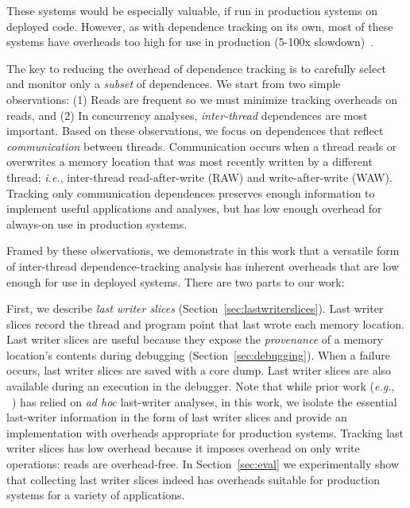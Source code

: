 \documentclass[preprint,9pt]{sigplanconf}
\begin{document}

These systems would be especially valuable, if run in production systems on
deployed code.  However, as with dependence tracking on its own, most of these
systems have overheads too high for use in production (5-100x
slowdown)~\cite{raceslicing,dmtracker,velodrome,recon,defuse,oshajava,chimera,coredet,stm}.


The key to reducing the overhead of dependence tracking is to carefully select
and monitor only a {\em subset} of dependences.  We start from two simple
observations: (1) Reads are frequent so we must minimize tracking overheads on
reads, and (2) In concurrency analyses, {\em inter-thread} dependences are most
important.  Based on these observations, we focus on dependences that reflect
{\em communication} between threads.  Communication occurs when a thread reads
or overwrites a memory location that was most recently written by a different
thread; {\em i.e.}, inter-thread read-after-write (RAW) and write-after-write
(WAW).  Tracking only communication dependences preserves enough information to
implement useful applications and analyses, but has low enough overhead for
always-on use in production systems.

Framed by these observations, we demonstrate in this work that a 
versatile form of inter-thread dependence-tracking analysis has inherent
overheads that are low enough for use in deployed systems.  There are two parts
to our work:

First, we describe {\em last writer slices}
(Section~\ref{sec:lastwriterslices}).  Last writer slices record the thread and
program point that last wrote each memory location.     Last writer slices are
useful because they expose the {\em provenance} of a memory location's contents
during debugging (Section~\ref{sec:debugging}).  When a failure occurs, last
writer slices are saved with a core dump.  Last writer slices are also
available during an execution in the debugger.  Note that while prior work
({\em e.g.}, ~\cite{recon,fasttrack,conmem,conseq,cci}) has relied on {\em ad
hoc} last-writer analyses, in this work, we isolate the essential last-writer
information in the form of last writer slices and provide an implementation
with overheads appropriate for production systems.  Tracking last writer slices
has low overhead because it imposes overhead on only write operations:  reads
are overhead-free.  In Section~\ref{sec:eval} we experimentally show that
collecting last writer slices indeed has overheads suitable for production
systems for a variety of applications.
\end{document}
